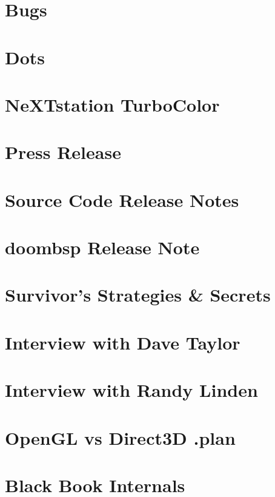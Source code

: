 \documentclass{book}
\begin{document}
    \appendix
    \appendixpage
      \chapter{Bugs}
      
    \chapter{Dots}  
      


    \chapter{NeXTstation TurboColor}
    
    
      \chapter{Press Release}
      
      \chapter{Source Code Release Notes}
      
      \chapter{doombsp Release Note}
      
      \chapter{Survivor's Strategies \& Secrets}
      
   
      \chapter{Interview with Dave Taylor}
      
      \chapter{Interview with Randy Linden}
            
      \chapter{OpenGL vs Direct3D .plan}
      
        \chapter{Black Book Internals}
    
    \cleartoleftpage %
    
    \blankpage
    \blankpage
\end{document}
